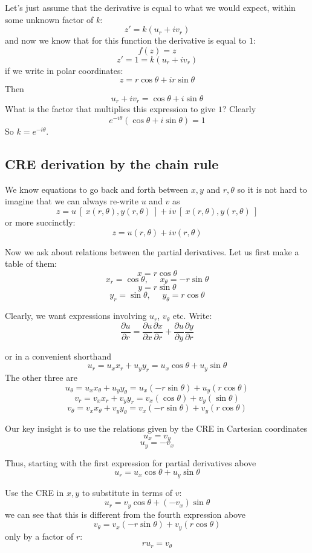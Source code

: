 \documentclass[11pt, oneside]{article}
\begin{document}
Let's just assume that the derivative is equal to what we would expect, within some unknown factor of $k$:
\[ z' = k(u_r + i v_r) \]
and now we know that for this function the derivative is equal to $1$:
\[ f(z) = z \]
\[ z' = 1 = k(u_r + i v_r) \]
if we write in polar coordinates:
\[ z = r \cos \theta + i r \sin \theta \]
Then 
\[ u_r + i v_r = \cos \theta + i \sin \theta \]
What is the factor that multiplies this expression to give $1$?
Clearly
\[ e^{- i \theta} (\cos \theta + i \sin \theta) = 1 \]
So $k = e^{- i \theta}$.

\subsection*{CRE derivation by the chain rule}

We know equations to go back and forth between $x,y$ and $r, \theta$ so it is not hard to imagine that we can always re-write $u$ and $v$ as
\[ z = u \ [ \ x(r, \theta), y(r, \theta) \ ] + i v \ [ \ x(r,\theta),y(r, \theta) \ ] \]
or more succinctly:
\[ z = u(r, \theta) + i v(r, \theta) \]

Now we ask about relations between the partial derivatives.  Let us first make a table of them:
\[ x = r \cos \theta \]
\[ x_r = \cos \theta, \ \ \ \ \ \ x_{\theta} = -r \sin \theta \]
\[ y = r \sin \theta \]
\[ y_r = \sin \theta, \ \ \ \ \ \ y_{\theta} = r \cos \theta \]

Clearly, we want expressions involving $u_r$, $v_{\theta}$ etc.  Write:
\[ \frac{\partial u}{\partial r} = \frac{\partial u}{\partial x} \frac{\partial x}{\partial r} + \frac{\partial u}{\partial y} \frac{\partial y}{\partial r} \]

or in a convenient shorthand
\[ u_r = u_x x_r + u_y y_r = u_x \cos \theta + u_y \sin \theta \]
The other three are
\[ u_{\theta} = u_x x_{\theta} + u_y y_{\theta} = u_x (-r \sin \theta) + u_y (r \cos \theta)  \]
\[ v_r = v_x x_r + v_y y_r = v_x (\cos \theta) + v_y (\sin \theta)  \]
\[ v_{\theta} = v_x x_{\theta} + v_y y_{\theta} = v_x (-r \sin \theta) + v_y (r \cos \theta) \]

Our key insight is to use the relations given by the CRE in Cartesian coordinates
\[ u_x = v_y \]
\[ u_y = -v_x \]

Thus, starting with the first expression for partial derivatives above
\[ u_r = u_x \cos \theta + u_y \sin \theta \]

Use the CRE in $x,y$ to substitute in terms of $v$:
\[ u_r = v_y \cos \theta + (-v_x) \sin \theta \]
we can see that this is different from the fourth expression above
\[ v_{\theta} = v_x (-r \sin \theta) + v_y (r \cos \theta) \]
only by a factor of $r$:
\[ r u_r = v_{\theta} \]
\end{document}

